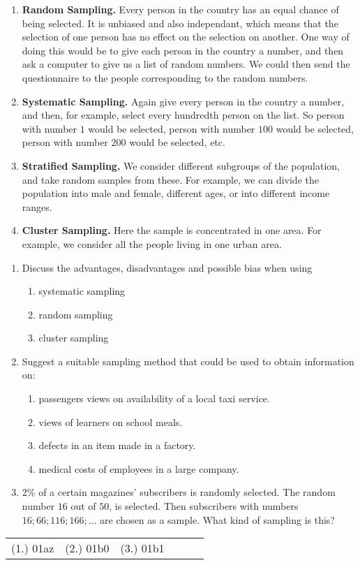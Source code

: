 \begin{enumerate}
\item[] \textbf{Random Sampling.} Every person in the country has an equal chance of being selected. It is unbiased and also independant, which means that the selection of one person has no effect on the selection on another. One way of doing this would be to give each person in the country a number, and then ask a computer to give us a list of random numbers. We could then send the questionnaire to the people corresponding to the random numbers.
\item[]  \textbf{Systematic Sampling.} Again give every person in the country a number, and then, for example, select every hundredth person on the list. So person with number $1$ would be selected, person with number $100$ would be selected, person with number $200$ would be selected, etc.
\item[] \textbf{Stratified Sampling.} We consider different subgroups of the population, and take random samples from these. For example, we can divide the population into male and female, different ages, or into different income ranges. 
\item[] \textbf{Cluster Sampling.} Here the sample is concentrated in one area. For example, we consider all the people living in one urban area.
\end{enumerate}

{
\begin{enumerate}
\item Discuss the advantages, disadvantages and possible bias when using
\begin{enumerate}
\item systematic sampling
\item random sampling
\item cluster sampling
\end{enumerate}
\item Suggest a suitable sampling method that could be used to obtain information on:
\begin{enumerate}
\item passengers views on availability of a local taxi service.
\item views of learners on school meals.
\item defects in an item made in a factory.
\item medical costs of employees in a large company.
\end{enumerate}
\item $2\%$ of a certain magazines' subscribers is randomly selected. The random number $16$ out of $50$, is selected. Then subscribers with numbers $16; 66; 116; 166; \ldots$ are chosen as a sample. What kind of sampling is this?
\end{enumerate}

\par \practiceinfo
\par \begin{tabular}[h]{cccccc}
(1.)	01az	&
(2.)	01b0	&
(3.)	01b1	&
\end{tabular}}

